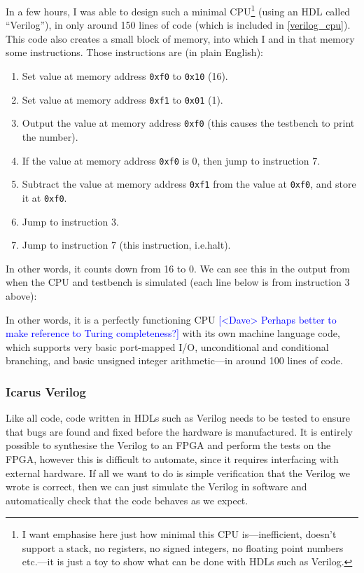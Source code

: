 \documentclass[12pt]{article}
\newcommand{\note}[2][red]{\textcolor{#1}{#2}}
\newcommand{\notedme}[1]{\note[blue]{[<Dave> #1]}}
\begin{document}
In a few hours, I was able to design such a minimal CPU\footnote{I want emphasise here just how minimal this CPU is---inefficient, doesn't support a stack, no registers, no signed integers, no floating point numbers etc.\@---it is just a toy to show what can be done with HDLs such as Verilog.} (using an HDL called ``Verilog''), in only around 150 lines of code (which is included in \ref{verilog_cpu}). This code also creates a small block of memory, into which I and in that memory some instructions. Those instructions are (in plain English):

\begin{enumerate}
	\item Set value at memory address \texttt{0xf0} to \texttt{0x10} (16).
	\item Set value at memory address \texttt{0xf1} to \texttt{0x01} (1).
	\item Output the value at memory address \texttt{0xf0} (this causes the testbench to print the number).
	\item If the value at memory address \texttt{0xf0} is 0, then jump to instruction 7.
	\item Subtract the value at memory address \texttt{0xf1} from the value at \texttt{0xf0}, and store it at \texttt{0xf0}.
	\item Jump to instruction 3.
	\item Jump to instruction 7 (this instruction, i.e.\@ halt).
\end{enumerate}

In other words, it counts down from 16 to 0. We can see this in the output from when the CPU and testbench is simulated (each line below is from instruction 3 above):



In other words, it is a perfectly functioning CPU \notedme{Perhaps better to make reference to Turing completeness?} with its own machine language code, which supports very basic port-mapped I/O, unconditional and conditional branching, and basic unsigned integer arithmetic---in around 100 lines of code.

\subsubsection{Icarus Verilog}

Like all code, code written in HDLs such as Verilog needs to be tested to ensure that bugs are found and fixed before the hardware is manufactured. It is entirely possible to synthesise the Verilog to an FPGA and perform the tests on the FPGA, however this is difficult to automate, since it requires interfacing with external hardware. If all we want to do is simple verification that the Verilog we wrote is correct, then we can just simulate the Verilog in software and automatically check that the code behaves as we expect.
\end{document}

